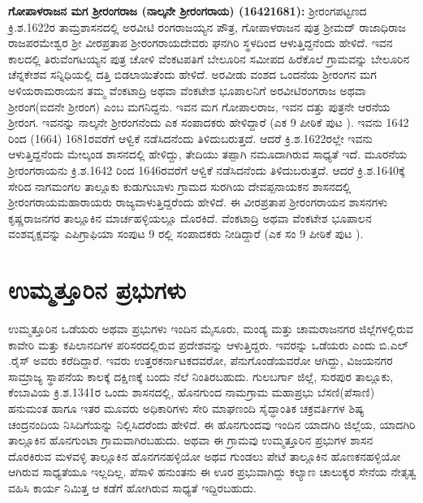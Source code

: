 \textbf{ಗೋಪಾಳರಾಜನ ಮಗ ಶ‍್ರೀರಂಗರಾಜ (ನಾಲ್ಕನೇ ಶ‍್ರೀರಂಗರಾಯ) (16421681): } ಶ‍್ರೀರಂಗಪಟ್ಟಣದ ಕ್ರಿ.ಶ.1622ರ ತಾಮ್ರಶಾಸನದಲ್ಲಿ ಅರವೀಟಿ ರಂಗರಾಜಯ್ಯನ ಪೌತ್ರ, ಗೋಪಾಳರಾಜನ ಪುತ್ರ ಶ‍್ರೀಮದ್​ ರಾಜಾಧಿರಾಜ ರಾಜಪರಮೇಶ್ವರ ಶ‍್ರೀ ವೀರಪ್ರತಾಪ ಶ‍್ರೀರಂಗರಾಯದೇವರು ಘನಗಿರಿ ಸ್ಥಳದಿಂದ ಆಳುತ್ತಿದ್ದನೆಂದು ಹೇಳಿದೆ. ಇವನ ಕಾಲದಲ್ಲಿ ತಿರುವೆಂಗಟಯ್ಯನ ಪುತ್ರ ಚೋಳಿ ವೆಂಕಟಪತಿಗೆ ಬೇಲೂರಿನ ಸಮೀಪದ ಹಿರೆಕೊಲೆ ಗ್ರಾಮವನ್ನು ಬೇಲೂರಿನ ಚೆನ್ನಕೇಶವ ಸನ್ನಿಧಿಯಲ್ಲಿ ದತ್ತಿ ಬಿಡಲಾಯಿತೆಂದು ಹೇಳಿದೆ. ಅರವೀಡು ವಂಶದ ಒಂದನೆಯ ಶ‍್ರೀರಂಗನ ಮಗ ಅಳಿಯರಾಮರಾಯನ ತಮ್ಮ ವೆಂಕಟಾದ್ರಿ ಅಥವಾ ವೆಂಕಟೇಶ ಭೂಪಾಲನಿಗೆ ಅರವೀಟಿರಂಗರಾಜ ಅಥವಾ ಶ‍್ರೀರಂಗ(ಐದನೇ ಶ‍್ರೀರಂಗ) ಎಂಬ ಮಗನಿದ್ದನು. ಇವನ ಮಗ ಗೋಪಾಲರಾಜ, ಇವನ ದತ್ತು ಪುತ್ರನೇ ಆರನೆಯ ಶ‍್ರೀರಂಗ. ಇವನನ್ನು ನಾಲ್ಕನೇ ಶ‍್ರೀರಂಗನೆಂದು ಎಕ ಸಂಪಾದಕರು ಹೇಳಿದ್ದಾರೆ (ಎಕ 9 ಪೀಠಿಕೆ ಪುಟ ). ಇವನು 1642 ರಿಂದ (1664) 1681ರವರೆಗೆ ಆಳ್ವಿಕೆ ನಡೆಸಿದನೆಂದು ತಿಳಿದುಬರುತ್ತದೆ. ಆದರೆ ಕ್ರಿ.ಶ.1622ರಲ್ಲೇ ಇವನು ಆಳುತ್ತಿದ್ದನೆಂದು ಮೇಲ್ಕಂಡ ಶಾಸನದಲ್ಲಿ ಹೇಳಿದ್ದು, ತೇದಿಯು ತಪ್ಪಾಗಿ ನಮೂದಾಗಿರುವ ಸಾಧ್ಯತೆ ಇದೆ. ಮೂರನೆಯ ಶ‍್ರೀರಂಗರಾಯನು ಕ್ರಿ.ಶ.1642 ರಿಂದ 1646ರವರೆಗೆ ಆಳ್ವಿಕೆ ನಡೆಸಿದನೆಂದು ತಿಳಿದುಬರುತ್ತದೆ. ಆದರೆ ಕ್ರಿ.ಶ.1640ಕ್ಕೆ ಸೇರಿದ ನಾಗಮಂಗಲ ತಾಲ್ಲೂಕು ಕುಡುಗುಬಾಳು ಗ್ರಾಮದ ಸುರಗಿಯ ದೇವಪ್ಪನಾಯಕನ ಶಾಸನದಲ್ಲಿ ಶ‍್ರೀರಂಗರಾಯಮಹಾರಾಯರು ರಾಜ್ಯವಾಳುತ್ತಿದ್ದರೆಂದು ಹೇಳಿದೆ. ಈ ವೀರಪ್ರತಾಪ ಶ‍್ರೀರಂಗರಾಯನ ಶಾಸನಗಳು ಕೃಷ್ಣರಾಜನಗರ ತಾಲ್ಲೂಕಿನ ಮಾರ್ಚಹಳ್ಳಿಯಲ್ಲೂ ದೊರಕಿದೆ. ವೆಂಕಟಾದ್ರಿ ಅಥವಾ ವೆಂಕಟೇಶ ಭೂಪಾಲನ ವಂಶವೃಕ್ಷವನ್ನು ಎಪಿಗ್ರಾಫಿಯಾ ಸಂಪುಟ 9 ರಲ್ಲಿ ಸಂಪಾದಕರು ನೀಡಿದ್ದಾರೆ (ಎಕ ಸಂ 9 ಪೀಠಿಕೆ ಪುಟ ).


\section{ಉಮ್ಮತ್ತೂರಿನ ಪ್ರಭುಗಳು}

ಉಮ್ಮತ್ತೂರಿನ ಒಡೆಯರು ಅಥವಾ ಪ್ರಭುಗಳು ಇಂದಿನ ಮೈಸೂರು, ಮಂಡ್ಯ ಮತ್ತು ಚಾಮರಾಜನಗರ ಜಿಲ್ಲೆಗಳಲ್ಲಿರುವ ಕಾವೇರಿ ಮತ್ತು ಕಪಿಲಾನದಿಗಳ ಪರಿಸರದಲ್ಲಿರುವ ಪ್ರದೇಶವನ್ನು ಆಳುತ್ತಿದ್ದರು. ಇವರನ್ನು ಒಡೆಯರು ಎಂದು ಬಿ.ಎಲ್​.ರೈಸ್​ ಅವರು ಕರೆದಿದ್ದಾರೆ. ಇವರು ಉತ್ತರಕರ್ನಾಟಕದವರೋ, ಪೆನುಗೊಂಡೆಯವರೋ ಆಗಿದ್ದು, ವಿಜಯನಗರ ಸಾಮ್ರಾಜ್ಯ ಸ್ಥಾಪನೆಯ ಕಾಲಕ್ಕೆ ದಕ್ಷಿಣಕ್ಕೆ ಬಂದು ನೆಲೆ ನಿಂತಿರಬಹುದು. ಗುಲಬರ್ಗಾ ಜಿಲ್ಲೆ, ಸುರಪುರ ತಾಲ್ಲೂಕು, ಕೆಂಬಾವಿಯ ಕ್ರಿ.ಶ.1341ರ ಒಂದು ಶಾಸನದಲ್ಲಿ, ಹೊನಗುಂದ ನಾಮಗ್ರಾಮ ಮಹಾಪ್ರಭು ಬೆಸಣಿ(ಪೆಸಾಣಿ) ಹನುಮಂತ ಹಾಗೂ ಇತರ ಮೂವರು ಅಧಿಕಾರಿಗಳು ಸೇರಿ ಮಾಘಣಂದಿ ಸೈದ್ಧಾಂತಿಕ ಚಕ್ರವರ್ತಿಗಳ ಶಿಷ್ಯ ಚಂದ್ರನಂದಿಯ ನಿಸಿದಿಗೆಯನ್ನು ನಿಲ್ಲಿಸಿದರೆಂದು ಹೇಳಿದೆ. ಈ ಹೊನಗುಂದವು ಇಂದಿನ ಯಾದಗಿರಿ ಜಿಲ್ಲೆಯ, ಯಾದಗಿರಿ ತಾಲ್ಲೂಕಿನ ಹೊನಗುಂಟಾ ಗ್ರಾಮವಾಗಿರಬಹುದು. ಅಥವಾ ಈ ಗ್ರಾಮವು ಉಮ್ಮತ್ತೂರಿನ ಪ್ರಭುಗಳ ಶಾಸನ ದೊರಕಿರುವ ಮಳವಳ್ಳಿ ತಾಲ್ಲೂಕಿನ ಹೊನಗನಹಳ್ಳಿಯೋ ಅಥವ ಗುಂಡಲು ಪೇಟೆ ತಾಲ್ಲೂಕಿನ ಹೊಣಕನಹಳ್ಳಿಯೋ ಆಗಿರುವ ಸಾಧ್ಯತೆಯೂ ಇಲ್ಲದಿಲ್ಲ. ಪೆಸಾಳಿ ಹನುಂತನು ಈ ಊರ ಪ್ರಭುವಾಗಿದ್ದು ಕಲ್ಯಾಣ ಚಾಲುಕ್ಯರ ಸೇನೆಯ ನೇತೃತ್ವ ವಹಿಸಿ ಕಾರ್ಯ ನಿಮಿತ್ತ ಆ ಕಡೆಗೆ ಹೋಗಿರುವ ಸಾಧ್ಯತೆ ಇದ್ದಿರಬಹುದು. 


